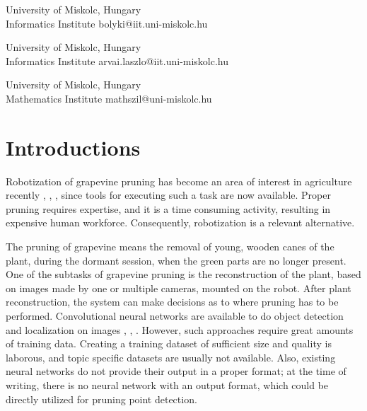 \documentclass{PSAIE}%
\begin{document}
%

\fancyfoot{}

\noindent{}

\noindent{}
{University of Miskolc, Hungary\\[0pt] Informatics Institute}
{bolyki@iit.uni-miskolc.hu}

\noindent{}
{University of Miskolc, Hungary\\[0pt] Informatics Institute}
{arvai.laszlo@iit.uni-miskolc.hu}

\noindent{}
{University of Miskolc, Hungary\\[0pt] Mathematics Institute}
{mathszil@uni-miskolc.hu}

\noindent\PSAIEreceived{\today}

\noindent{}

\noindent{}

\section{Introductions}
Robotization of grapevine pruning has become an area of interest in agriculture recently
\cite{botterill2017robot}, \cite{fernandes2021grapevine}, \cite{katyara2020reproducible}, since
tools for executing such a task are now available. Proper pruning requires expertise, and it is
a time consuming activity, resulting in expensive human workforce. Consequently, robotization is
a relevant alternative.

The pruning of grapevine means the removal of young, wooden canes of the plant, during the dormant session,
when the green parts are no longer present.
One of the subtasks of grapevine pruning is the reconstruction of the plant, based on images made by
one or multiple cameras, mounted on the robot. After plant reconstruction, the system can make decisions
as to where pruning has to be performed. Convolutional neural networks are available to do
object detection and localization on images \cite{glenn_jocher_2021_5563715}, \cite{matterport_maskrcnn_2017},
\cite{liu2016ssd}. However, such approaches require great amounts of training data. Creating a training
dataset of sufficient size and quality is laborous, and topic specific datasets are usually not available.
Also, existing neural networks do not provide their output in a proper format; at the time of writing,
there is no neural network with an output format, which could be directly utilized for pruning point
detection.
\end{document}
